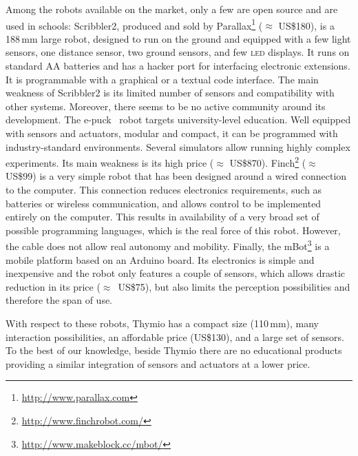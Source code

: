 \documentclass[letterpaper, 10 pt, conference]{ieeeconf}  %
\begin{document}
Among the robots available on the market, only a few are open source and are used in schools:
Scribbler2, produced and sold by Parallax\footnote{\url{http://www.parallax.com}} ($\approx$ US\$180), is a 188\,mm large robot, designed to run on the ground and equipped with a few light sensors, one distance sensor, two ground sensors, and few \textsc{led} displays.
It runs on standard AA batteries and has a hacker port for interfacing electronic extensions.
It is programmable with a graphical or a textual code interface.  
The main weakness of Scribbler2 is its limited number of sensors and compatibility with other systems. 
Moreover, there seems to be no active community around its development.
The e-puck~\cite{mondada2009puck} robot targets university-level education.
Well equipped with sensors and actuators, modular and compact, it can be programmed with industry-standard environments.
Several simulators allow running highly complex experiments. 
Its main weakness is its high price ($\approx$ US\$870).
Finch\footnote{\url{http://www.finchrobot.com/}} ($\approx$ US\$99) is a very simple robot that has been designed around a wired connection to the computer. 
This connection reduces electronics requirements, such as batteries or wireless communication, and allows control to be implemented entirely on the computer.
This results in availability of a very broad set of possible programming languages, which is the real force of this robot. 
However, the cable does not allow real autonomy and mobility.
Finally, the mBot\footnote{\url{http://www.makeblock.cc/mbot/}} is a mobile platform based on an Arduino board.
Its electronics is simple and inexpensive and the robot only features a couple of sensors, which allows drastic reduction in its price ($\approx$~US\$75), but also limits the perception possibilities and therefore the span of use.

With respect to these robots, Thymio has a compact size (110\,mm), many interaction possibilities, an affordable price (US\$130), and a large set of sensors.
To the best of our knowledge, beside Thymio there are no educational products providing a similar integration of sensors and actuators at a lower price.
\end{document}
